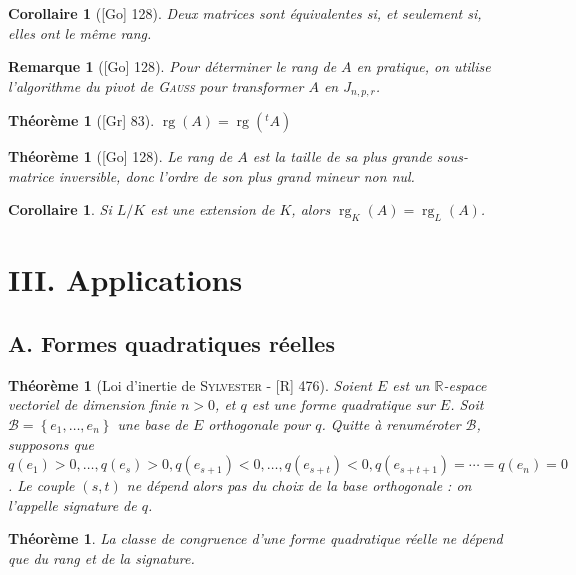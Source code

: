 \documentclass[10pt, a4paper, parskip=full, twoside, twocolumn]{report}
\newtheorem{theorem}[definition]{Théorème}
\newtheorem{corollary}[definition]{Corollaire}
\newtheorem{remark}[definition]{Remarque}
\newcommand{\IR}{\mathbb{R}}
\DeclareMathOperator{\rg}{rg}
\begin{document}
\begin{corollary}[\textnormal{[Go] 128}]
	Deux matrices sont équivalentes si, et seulement si, elles ont le même rang.
\end{corollary}

\begin{remark}[\textnormal{[Go] 128}]
	Pour déterminer le rang de $A$ en pratique, on utilise l'algorithme du pivot de \textsc{Gauss}
	pour transformer $A$ en $J_{n,p,r}$.
\end{remark}

\begin{theorem}[\textnormal{[Gr] 83}]
	$\rg(A) = \rg(^tA)$
\end{theorem}

\begin{theorem}[\textnormal{[Go] 128}]
	Le rang de $A$ est la taille de sa plus grande sous-matrice inversible, donc l'ordre de son plus grand mineur non nul.
\end{theorem}

\begin{corollary}
	Si $L/K$ est une extension de $K$, alors $\rg_K(A) = \rg_L(A)$.
\end{corollary}

\section*{III. Applications}
\subsection*{A. Formes quadratiques réelles}


\begin{tcolorbox}[
    breakable, %
    colback=developpement, %
    colframe=gray!0!black, %
    boxrule=0pt, %
    arc=1mm, %
	boxsep=0pt,
	left=0pt, right=0pt, top=0pt, bottom=0pt
]
\begin{theorem}[Loi d'inertie de \textsc{Sylvester} - \textnormal{[R] 476}]
	\label{148dev11}
	Soient $E$ est un $\IR$-espace vectoriel de dimension finie $n>0$, et $q$ est une 
	forme quadratique sur $E$.
	Soit $\mathcal{B} = \left\{e_1,\dots, e_n\right\}$ une base de $E$ orthogonale pour $q$.
	Quitte à renuméroter $\mathcal{B}$, supposons que $q(e_1) > 0,\dots, q(e_s) > 0, q(e_{s+1}) < 0,\dots, q(e_{s+t}) < 0, q(e_{s+t+1}) = \cdots = q(e_n) = 0$.
	Le couple $(s,t)$ ne dépend alors pas du choix de la base orthogonale : on l'appelle \emph{signature de $q$}.
\end{theorem}

\begin{theorem}
	\label{148dev12}
	La classe de congruence d'une forme quadratique réelle ne dépend que du rang et de la signature.
\end{theorem}
\end{tcolorbox}
\end{document}
